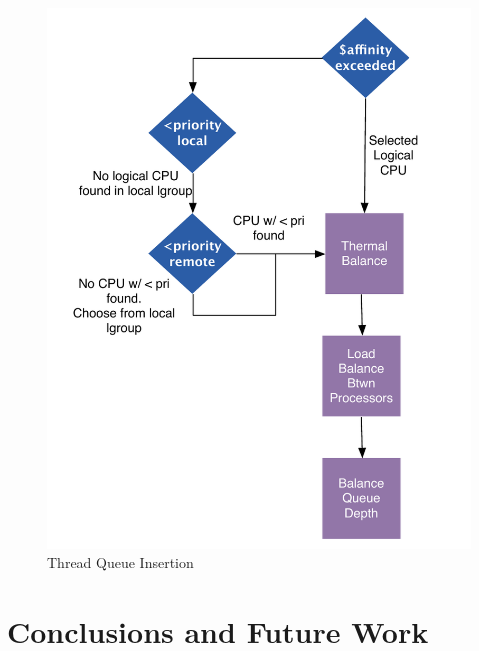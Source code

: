 \documentclass[]{sig-alternate-hotpower09}
\begin{document}
\begin{figure}[htbp]
  \centering
  \includegraphics[scale=0.40]{threadinsert.pdf}
  \caption{Thread Queue Insertion}
  \label{fig:thread}
\end{figure}

\section{Conclusions and Future Work}
\label{sec:conclusions}

\label{sec:references}




\end{document}

